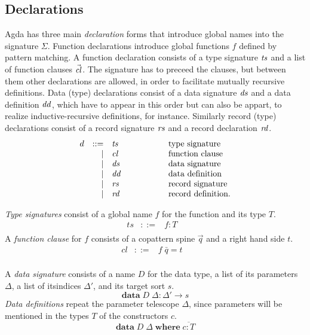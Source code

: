 \documentclass[acmlarge,fleqn]{acmart}\settopmatter{}
\renewcommand{\|}{\mid}
\begin{document}
\subsection{Declarations}
\label{sec:declarations}

Agda has three main \emph{declaration} forms that introduce global names into
the signature $\Sigma$.  Function declarations introduce global
functions $f$ defined by pattern matching.  A function declaration
consists of a type signature $\mathit{ts}$ and a list of function clauses
$\vec{\mathit{cl}}$.  The signature has to preceed the clauses, but between
them other declarations are allowed, in order to facilitate mutually
recursive definitions.  Data (type) declarations consist of a data
signature $\mathit{ds}$ and a data definition $\mathit{dd}$, which have to appear in
this order but can also be appart, to realize inductive-recursive
definitions, for instance.  Similarly record (type) declarations
consist of a record signature $\mathit{rs}$ and a record declaration $\mathit{rd}$.
\[
\begin{array}{lrl@{\hspace{2cm}}l}
d  & ::=  & \mathit{ts} & \mbox{type signature}
\\ & \mid & \mathit{cl} & \mbox{function clause}
\\ & \mid & \mathit{ds} & \mbox{data signature}
\\ & \mid & \mathit{dd} & \mbox{data definition}
\\ & \mid & \mathit{rs} & \mbox{record signature}
\\ & \mid & \mathit{rd} & \mbox{record definition}.

\end{array}
 \]

\emph{Type signatures} consist of a global name $f$ for the function and its type $T$.
\[\begin{array}{lrll}
ts &::=& f : T &\\
\end{array} \]
A \emph{function clause} for $f$ consists of a copattern spine $\vec q$ and a right hand side $t$.
\[
\begin{array}{lrll}
cl &::=& f\; \bar{q} = t &\\
\end{array}
\]

A \emph{data signature} consists of a name $D$ for the data type,
a list of its parameters $\Delta$,
a list of itsindices $\Delta'$,
and its target sort $s$.
\[
\textbf{data}\; D\; \Delta : \Delta' \to s
\]
\emph{Data definitions} repeat the parameter telescope $\Delta$,
since parameters will be mentioned in the types $T$ of the constructors $c$.
\[
\textbf{data}\; D\; \Delta \;\textbf{where}\; \overline{c : T}
\]
\end{document}
